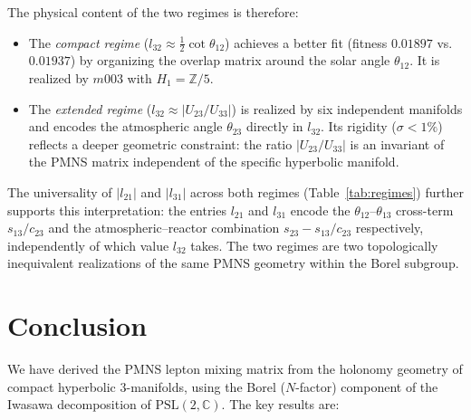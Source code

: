 \documentclass[epjc3]{svjour3}
\newcommand{\PSL}{\mathrm{PSL}(2,\mathbb{C})}
\begin{document}
The physical content of the two regimes is therefore:
\begin{itemize}
\item The \emph{compact regime} ($l_{32} \approx \tfrac{1}{2}\cot\theta_{12}$)
achieves a better fit (fitness $0.01897$ vs.\ $0.01937$) by
organizing the overlap matrix around the solar angle $\theta_{12}$.
It is realized by $m003$ with $H_1 = \mathbb{Z}/5$.
\item The \emph{extended regime} ($l_{32} \approx |U_{23}/U_{33}|$)
is realized by six independent manifolds and encodes the atmospheric
angle $\theta_{23}$ directly in $l_{32}$. Its rigidity ($\sigma < 1\%$)
reflects a deeper geometric constraint: the ratio $|U_{23}/U_{33}|$
is an invariant of the PMNS matrix independent of the specific
hyperbolic manifold.
\end{itemize}
 
The universality of $|l_{21}|$ and $|l_{31}|$ across both regimes
(Table~\ref{tab:regimes}) further supports this interpretation:
the entries $l_{21}$ and $l_{31}$ encode the $\theta_{12}$--$\theta_{13}$
cross-term $s_{13}/c_{23}$ and the atmospheric--reactor combination
$s_{23} - s_{13}/c_{23}$ respectively, independently of which
value $l_{32}$ takes.
The two regimes are two topologically inequivalent realizations of
the same PMNS geometry within the Borel subgroup.

\section{Conclusion}
\label{sec:conclusion}

We have derived the PMNS lepton mixing matrix from the holonomy
geometry of compact hyperbolic 3-manifolds, using the Borel
($N$-factor) component of the Iwasawa decomposition of $\PSL$.
The key results are:
\end{document}
